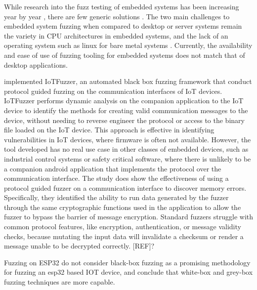 \documentclass[../report.tex]{subfiles}
\begin{document}

While research into the fuzz testing of embedded systems has been increasing
year by year \citep{Yun_2022}, there are few generic solutions
\citep{Eisele_et_al_2022}. The two main challenges to embedded system fuzzing
when compared to desktop or server systems remain the variety in CPU
architectures in embedded systems, and the lack of an operating system such as
linux for bare metal systems \citep{Eisele_et_al_2022}. Currently, the
availability and ease of use of fuzzing tooling for embedded systems does not
match that of desktop applications.

\citet{IOTFuzzer_2018} implemented IoTFuzzer, an automated black box fuzzing
framework that conduct protocol guided fuzzing on the communication interfaces
of IoT devices. IoTFuzzer performs dynamic analysis on the companion
application to the IoT device to identify the methods for creating valid
communication messages to the device, without needing to reverse engineer the
protocol or access to the binary file loaded on the IoT device. This approach
is effective in identifying vulnerabilities in IoT devices, where firmware is
often not available. However, the tool developed has no real use case in other
classes of embedded devices, such as industrial control systems or safety
critical software, where there is unlikely to be a companion android
application that implements the protocol over the communication interface.
The study does show the effectiveness of using a protocol guided
fuzzer on a communication interface to discover memory errors. Specifically,
they identified the ability to run data generated by the fuzzer through the same
cryptographic functions used in the application to allow the fuzzer to bypass
the barrier of message encryption. Standard fuzzers struggle with common
protocol features, like encryption, authentication, or message validity checks,
because mutating the input data will invalidate a checksum or render a message
unable to be decrypted correctly. [REF]?

\citet{Borsig_2020} Fuzzing on ESP32
\citet{Borsig_2020} do not consider black-box fuzzing as a
promising methodology for fuzzing an esp32 based IOT device, and conclude that
white-box and grey-box fuzzing techniques are more capable.
\end{document}
